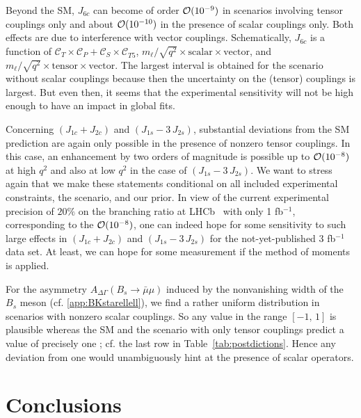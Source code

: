 \documentclass[twocolumn,epjc3]{svjour3}
\numberwithin{equation}{section}
\def \refapp#1{\ref{#1}}
\def \reftab#1{Table~\ref{#1}}
\newcommand{\christoph}[1]{{\color{red}{#1}}}
\newcommand{\checked}[1]{{\color{brown}{ {\bf Checked: }{#1}}}}
\renewcommand{\checked}[1]{#1}
\newcommand{\wilson}[2][{}]{\mathcal{C}_{#2}^{\mathrm{#1}}}
\renewcommand{\[}{\big[}
\renewcommand{\]}{\big]}
\renewcommand{\(}{\big(}
\renewcommand{\)}{\big)}
\begin{document}
Beyond the SM, $J_{6c}$ can become of order ${\cal O}(10^{-9})$ in scenarios
involving tensor couplings only and about ${\cal O}(10^{-10})$ in the presence
of scalar couplings only. Both effects are due to interference with vector
couplings.  Schematically, $J_{6c}$ is a function of $\wilson{T} \times
\wilson{P} + \wilson{S} \times \wilson{T5}$, {$m_{\ell}/\sqrt{q^2} \times
\mbox{scalar} \times \mbox{vector}$, and $m_{\ell}/\sqrt{q^2} \times
\mbox{tensor} \times \mbox{vector}$}. The largest interval is obtained for
the scenario without scalar couplings because then the uncertainty on the
(tensor) couplings is largest. But even then, it {seems that the} experimental
sensitivity will not be high enough to have an impact in global fits.

Concerning $(J_{1c} + J_{2c})$ and $(J_{1s} - 3\, J_{2s})$, substantial
deviations from the SM prediction are again only possible in the presence of
nonzero tensor couplings. In this case, an enhancement by two orders of
magnitude is possible up to ${\cal O}(10^{-8})$ at high $q^2$ and also at low
$q^2$ in the case of $(J_{1s} - 3\, J_{2s})$. We want to stress again that we
make these statements conditional on all included experimental constraints, the
scenario, and our prior. In view of the current experimental precision of $20\%$
on the branching ratio at LHCb~\cite{Aaij:2013iag} with only 1 fb$^{-1}$,
corresponding to the ${\cal O}(10^{-8})$, one can indeed hope for some
sensitivity to such large effects in $(J_{1c} + J_{2c})$ and $(J_{1s} - 3\,
J_{2s})$ for the not-yet-published 3 fb$^{-1}$ data set. At least, we can hope
for some measurement if the method of moments~\cite{beaujean:2015mom} is
applied.

For the \christoph{mass-eigenstate rate} asymmetry $A_{\Delta\Gamma}(B_s\to \bar\mu\mu)$ induced by
the nonvanishing width of the $B_s$ meson
(cf. \refapp{app:BKstarellell}), we find a rather uniform distribution
in scenarios with nonzero scalar couplings. So any value in the range
$[-1,\, 1]$ is plausible whereas {the SM and the scenario
  with only tensor couplings predict a value of precisely one
  \cite{DeBruyn:2012wk}}; cf. the last row in
\reftab{tab:postdictions}. Hence any deviation from one would
unambiguously hint at the presence of scalar operators.


%
%
%
\section{\checked{Conclusions}}
\end{document}
